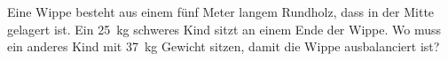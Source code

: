 
\begin{aufgabe}
	Eine Wippe besteht aus einem fünf Meter langem Rundholz, dass in der Mitte gelagert ist.
	Ein \SI{25}{kg} schweres Kind sitzt an einem Ende der Wippe. Wo muss ein anderes Kind mit \SI{37}{kg}
	Gewicht sitzen, damit die Wippe ausbalanciert ist?
\end{aufgabe}

